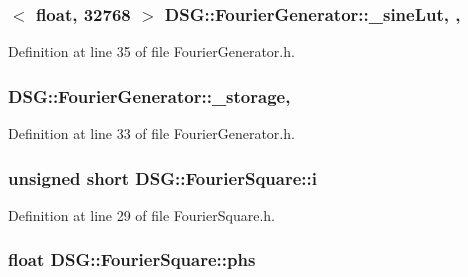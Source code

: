 \hypertarget{classDSG_1_1FourierGenerator_a1ae5fb243ce05e638bdf0dec8bde7426}{
\subsubsection[{\+\_\+sine\+Lut}]{$<$ float, 32768 $>$ D\+S\+G\+::\+Fourier\+Generator\+::\+\_\+sine\+Lut\hspace{0.3cm}{\ttfamily [static]}, {\ttfamily [protected]}, {\ttfamily [inherited]}}}\label{classDSG_1_1FourierGenerator_a1ae5fb243ce05e638bdf0dec8bde7426}


Definition at line 35 of file Fourier\+Generator.\+h.

\hypertarget{classDSG_1_1FourierGenerator_a6b7f2439b26914cc9df6b6975a2cedac}{
\subsubsection[{\+\_\+storage}]{ D\+S\+G\+::\+Fourier\+Generator\+::\+\_\+storage\hspace{0.3cm}{\ttfamily [protected]}, {\ttfamily [inherited]}}}\label{classDSG_1_1FourierGenerator_a6b7f2439b26914cc9df6b6975a2cedac}


Definition at line 33 of file Fourier\+Generator.\+h.

\hypertarget{classDSG_1_1FourierSquare_a4d191ba0c4aad4946cc60f90b7c48d88}{
\subsubsection[{i}]{\setlength{\rightskip}{0pt plus 5cm}unsigned short D\+S\+G\+::\+Fourier\+Square\+::i\hspace{0.3cm}{\ttfamily [protected]}}}\label{classDSG_1_1FourierSquare_a4d191ba0c4aad4946cc60f90b7c48d88}


Definition at line 29 of file Fourier\+Square.\+h.

\hypertarget{classDSG_1_1FourierSquare_a49d0e6f221e67139d47f68c7e4b9b1a9}{
\subsubsection[{phs}]{\setlength{\rightskip}{0pt plus 5cm}float D\+S\+G\+::\+Fourier\+Square\+::phs\hspace{0.3cm}{\ttfamily [protected]}}}\label{classDSG_1_1FourierSquare_a49d0e6f221e67139d47f68c7e4b9b1a9}


